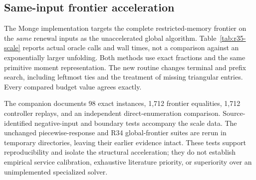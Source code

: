 \subsection{Same-input frontier acceleration}\label{sec:r35-evidence}
The Monge implementation targets the complete restricted-memory frontier on the \emph{same} renewal inputs as the unaccelerated global algorithm. Table~\ref{tab:r35-scale} reports actual oracle calls and wall times, not a comparison against an exponentially larger unfolding. Both methods use exact fractions and the same primitive moment representation. The new routine changes terminal and prefix search, including leftmost ties and the treatment of missing triangular entries. Every compared budget value agrees exactly.

The companion documents 98 exact instances, 1,712 frontier equalities, 1,712 controller replays, and an independent direct-enumeration comparison. Source-identified negative-input and boundary tests accompany the scale data. The unchanged piecewise-response and R34 global-frontier suites are rerun in temporary directories, leaving their earlier evidence intact. These tests support reproducibility and isolate the structural acceleration; they do not establish empirical service calibration, exhaustive literature priority, or superiority over an unimplemented specialized solver.

